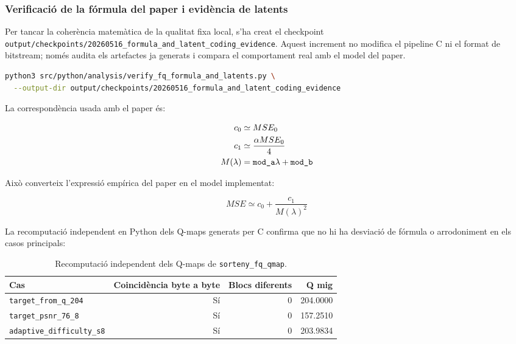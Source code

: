 \documentclass[11pt,a4paper]{article}
\begin{document}
\subsubsection{Verificació de la fórmula del paper i evidència de latents}

Per tancar la coherència matemàtica de la qualitat fixa local, s'ha creat el checkpoint \texttt{output/checkpoints/20260516\_formula\_and\_latent\_coding\_evidence}. Aquest increment no modifica el pipeline C ni el format de bitstream; només audita els artefactes ja generats i compara el comportament real amb el model del paper.

\begin{lstlisting}[language=bash]
python3 src/python/analysis/verify_fq_formula_and_latents.py \
  --output-dir output/checkpoints/20260516_formula_and_latent_coding_evidence
\end{lstlisting}

La correspondència usada amb el paper és:

\begin{align}
  c_0 &\simeq MSE_0 \\
  c_1 &\simeq \frac{\alpha MSE_0}{4} \\
  M(\lambda) &= \text{\texttt{mod\_a}}\lambda + \text{\texttt{mod\_b}}
\end{align}

Això converteix l'expressió empírica del paper en el model implementat:

\begin{equation}
  MSE \simeq c_0 + \frac{c_1}{M(\lambda)^2}
\end{equation}

La recomputació independent en Python dels Q-maps generats per C confirma que no hi ha desviació de fórmula o arrodoniment en els casos principals:

\begin{table}[H]
\centering
\begin{tabular}{lrrr}
\toprule
\textbf{Cas} & \textbf{Coincidència byte a byte} & \textbf{Blocs diferents} & \textbf{Q mig} \\
\midrule
\texttt{target\_from\_q\_204} & Sí & 0 & 204.0000 \\
\texttt{target\_psnr\_76\_8} & Sí & 0 & 157.2510 \\
\texttt{adaptive\_difficulty\_s8} & Sí & 0 & 203.9834 \\
\bottomrule
\end{tabular}
\caption{Recomputació independent dels Q-maps de \texttt{sorteny\_fq\_qmap}.}
\end{table}
\end{document}
